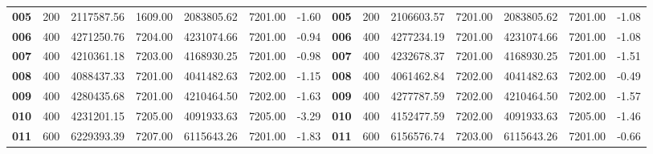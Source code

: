 \begin{table}[ht]
{\begin{tabular}{cccccccccccccc}
    \textbf{005}         & 200                         & 2117587.56          & 1609.00          & 2083805.62           & 7201.00       & -1.60                          & \textbf{005}         & 200                         & 2106603.57           & 7201.00           & 2083805.62           & 7201.00        & -1.08                           \\
    \textbf{006}         & 400                         & 4271250.76          & 7204.00          & 4231074.66           & 7201.00       & -0.94                          & \textbf{006}         & 400                         & 4277234.19           & 7201.00           & 4231074.66           & 7201.00        & -1.08                           \\
    \textbf{007}         & 400                         & 4210361.18          & 7203.00          & 4168930.25           & 7201.00       & -0.98                          & \textbf{007}         & 400                         & 4232678.37           & 7201.00           & 4168930.25           & 7201.00        & -1.51                           \\
    \textbf{008}         & 400                         & 4088437.33          & 7201.00          & 4041482.63           & 7202.00       & -1.15                          & \textbf{008}         & 400                         & 4061462.84           & 7202.00           & 4041482.63           & 7202.00        & -0.49                           \\
    \textbf{009}         & 400                         & 4280435.68          & 7201.00          & 4210464.50           & 7202.00       & -1.63                          & \textbf{009}         & 400                         & 4277787.59           & 7202.00           & 4210464.50           & 7202.00        & -1.57                           \\
    \textbf{010}         & 400                         & 4231201.15          & 7205.00          & 4091933.63           & 7205.00       & -3.29                          & \textbf{010}         & 400                         & 4152477.59           & 7202.00           & 4091933.63           & 7205.00        & -1.46                           \\
    \textbf{011}         & 600                         & 6229393.39          & 7207.00          & 6115643.26           & 7201.00       & -1.83                          & \textbf{011}         & 600                         & 6156576.74           & 7203.00           & 6115643.26           & 7201.00        & -0.66                           \\

\end{tabular}}
\end{table}
